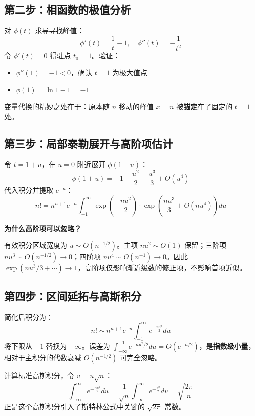 \documentclass[11pt,a4paper]{ctexart}
\newcommand{\highlight}[1]{\colorbox{accent!20}{\sffamily\bfseries #1}}
\begin{document}
\subsection*{第二步：相函数的极值分析}

对 $\phi(t)$ 求导寻找峰值：
\[
  \phi'(t) = \frac{1}{t} - 1, \quad \phi''(t) = -\frac{1}{t^2}
\]
令 $\phi'(t) = 0$ 得驻点 $t_0 = 1$。验证：
\begin{itemize}
  \item $\phi''(1) = -1 < 0$，确认 $t=1$ 为极大值点
  \item $\phi(1) = \ln 1 - 1 = -1$
\end{itemize}
变量代换的精妙之处在于：原本随 $n$ 移动的峰值 $x=n$ 被\highlight{锚定}在了固定的 $t=1$ 处。

\subsection*{第三步：局部泰勒展开与高阶项估计}

令 $t = 1 + u$，在 $u=0$ 附近展开 $\phi(1+u)$：
\[
  \phi(1+u) = -1 - \frac{u^2}{2} + \frac{u^3}{3} + O(u^4)
\]
代入积分并提取 $e^{-n}$：
\[
  n! = n^{n+1} e^{-n} \int_{-1}^\infty \exp\!\left(-\frac{n u^2}{2}\right) \cdot \exp\!\left(\frac{n u^3}{3} + O(n u^4)\right) du
\]

\begin{tcolorbox}[
  enhanced, colframe=accent!80, colback=accent!10,
  sharp corners, boxrule=1pt, left=4mm, right=4mm, top=3mm, bottom=3mm,
  before skip=0.8em, after skip=0.8em,
]
\sffamily\bfseries 为什么高阶项可以忽略？

\rmfamily\normalsize
有效积分区域宽度为 $u \sim O(n^{-1/2})$。主项 $nu^2 \sim O(1)$ 保留；三阶项 $nu^3 \sim O(n^{-1/2}) \to 0$；四阶项 $nu^4 \sim O(n^{-1}) \to 0$。因此 $\exp(nu^3/3 + \cdots) \to 1$，高阶项仅影响渐近级数的修正项，不影响首项近似。
\end{tcolorbox}

\subsection*{第四步：区间延拓与高斯积分}

简化后积分为：
\[
  n! \sim n^{n+1} e^{-n} \int_{-1}^\infty e^{-\frac{n u^2}{2}} du
\]
将下限从 $-1$ 替换为 $-\infty$。误差为 $\int_{-\infty}^{-1} e^{-nu^2/2} du = O(e^{-n/2})$，是\highlight{指数级小量}，相对于主积分的代数衰减 $O(n^{-1/2})$ 可完全忽略。

计算标准高斯积分，令 $v = u\sqrt{n}$：
\[
  \int_{-\infty}^\infty e^{-\frac{n u^2}{2}} du = \frac{1}{\sqrt{n}} \int_{-\infty}^\infty e^{-\frac{v^2}{2}} dv = \sqrt{\frac{2\pi}{n}}
\]
正是这个高斯积分引入了斯特林公式中关键的 $\sqrt{2\pi}$ 常数。
\end{document}
